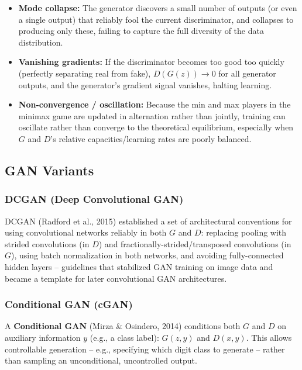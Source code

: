 \documentclass[12pt,a4paper]{article}
\begin{document}
\begin{itemize}[leftmargin=1.5em]
    \item \textbf{Mode collapse:} The generator discovers a small number of outputs (or even a single output) that reliably fool the current discriminator, and collapses to producing only these, failing to capture the full diversity of the data distribution.
    \item \textbf{Vanishing gradients:} If the discriminator becomes too good too quickly (perfectly separating real from fake), $D(G(z)) \to 0$ for all generator outputs, and the generator's gradient signal vanishes, halting learning.
    \item \textbf{Non-convergence / oscillation:} Because the min and max players in the minimax game are updated in alternation rather than jointly, training can oscillate rather than converge to the theoretical equilibrium, especially when $G$ and $D$'s relative capacities/learning rates are poorly balanced.
\end{itemize}

\subsection{GAN Variants}

\subsubsection{DCGAN (Deep Convolutional GAN)}

DCGAN (Radford et al., 2015) established a set of architectural conventions for using convolutional networks reliably in both $G$ and $D$: replacing pooling with strided convolutions (in $D$) and fractionally-strided/transposed convolutions (in $G$), using batch normalization in both networks, and avoiding fully-connected hidden layers -- guidelines that stabilized GAN training on image data and became a template for later convolutional GAN architectures.

\subsubsection{Conditional GAN (cGAN)}

A \textbf{Conditional GAN} (Mirza \& Osindero, 2014) conditions both $G$ and $D$ on auxiliary information $y$ (e.g., a class label): $G(z, y)$ and $D(x, y)$. This allows controllable generation -- e.g., specifying which digit class to generate -- rather than sampling an unconditional, uncontrolled output.
\end{document}
